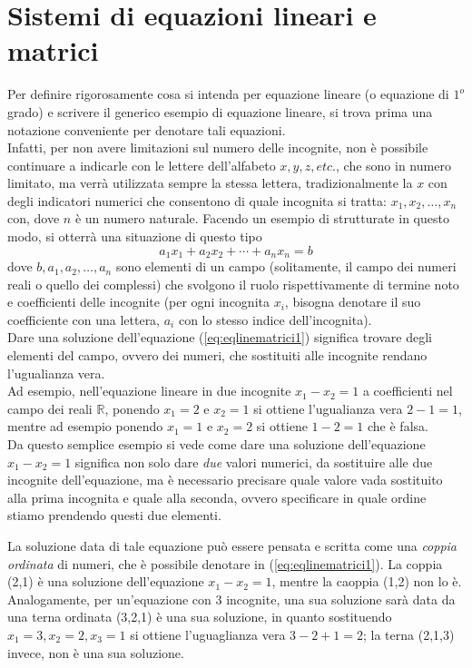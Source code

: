 \chapter{Sistemi di equazioni lineari e matrici}
\label{chap:eqlinematrici}

Per definire rigorosamente cosa si intenda per equazione lineare
(o equazione di $1^o$ grado) e scrivere il generico esempio di
equazione lineare, si trova prima una notazione conveniente per
denotare tali equazioni.\\
Infatti, per non avere limitazioni sul numero delle incognite,
non è possibile continuare a indicarle con le lettere
dell'alfabeto $x,y,z,etc.$, che sono in numero limitato, ma
verrà utilizzata sempre la stessa lettera, tradizionalmente
la $x$ con degli indicatori numerici che consentono di
quale incognita si tratta: $x_1,x_2,\dots,x_n$ con, dove $n$ è
un numero naturale. Facendo un esempio di strutturate in questo
modo, si otterrà una situazione di questo tipo
\begin{equation}
  \label{eq:eqlinematrici1}
  a_1x_1+a_2x_2+\cdots+a_nx_n=b
\end{equation}
dove $b,a_1,a_2,\dots,a_n$ sono elementi di un campo
(solitamente, il campo dei numeri reali o quello dei complessi)
che svolgono il ruolo rispettivamente di termine noto e
coefficienti delle incognite (per ogni incognita $x_i$, bisogna
denotare il suo coefficiente con una lettera, $a_i$ con lo stesso
indice dell'incognita).\\
Dare una soluzione dell'equazione (\ref{eq:eqlinematrici1})
significa trovare degli elementi del campo, ovvero dei numeri,
che sostituiti alle incognite rendano l'ugualianza vera.\\
Ad esempio, nell'equazione lineare in due incognite $x_1-x_2=1$
a coefficienti nel campo dei reali $\mathds{R}$, ponendo $x_1=2$
e $x_2=1$ si ottiene l'ugualianza vera $2-1=1$, mentre ad esempio
ponendo $x_1=1$ e $x_2=2$ si ottiene $1-2=1$ che è falsa.\\
Da questo semplice esempio si vede come dare una soluzione
dell'equazione $x_1-x_2=1$ significa non solo dare \textit{due}
valori numerici, da sostituire alle due incognite
dell'equazione, ma è necessario precisare quale valore vada
sostituito alla prima incognita e quale alla seconda, ovvero
specificare in quale ordine stiamo prendendo questi due
elementi.

La soluzione data di tale equazione può essere pensata e scritta
come una \textit{coppia ordinata} di numeri, che è possibile
denotare in (\ref{eq:eqlinematrici1}). La coppia (2,1) è una
soluzione dell'equazione $x_1-x_2=1$, mentre la caoppia (1,2) non
lo è.\\
Analogamente, per un'equazione con 3 incognite, una sua
soluzione sarà data da una terna ordinata (3,2,1) è una sua
soluzione, in quanto sostituendo $x_1=3,x_2=2,x_3=1$ si ottiene
l'uguaglianza vera $3-2+1=2$; la terna (2,1,3) invece, non è una
sua soluzione.

